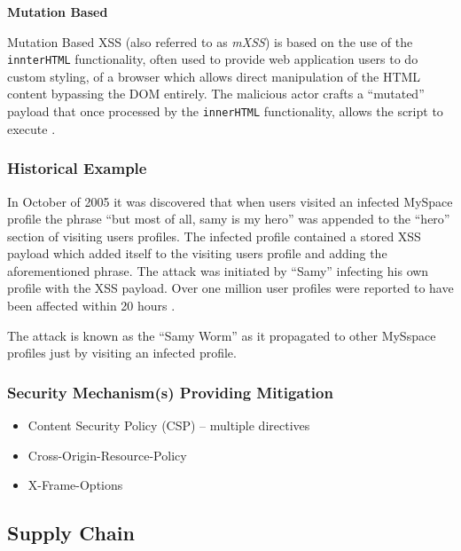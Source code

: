 \documentclass{mscreport}
\begin{document}
\vspace{0.6cm} \noindent
\textbf{Mutation Based}

\vspace{0.2cm} \noindent
Mutation Based XSS (also referred to as \textit{mXSS}) is based on the use of the \texttt{innterHTML} functionality, often used to provide web application users to do custom styling, of a browser which allows direct manipulation of the HTML content bypassing the DOM entirely. The malicious actor crafts a ``mutated'' payload that once processed by the \texttt{innerHTML} functionality, allows the script to execute \cite{Heiderich2013-qv}.

\subsubsection{Historical Example}
In October of 2005 it was discovered that when users visited an infected MySpace profile the phrase ``but most of all, samy is my hero'' was appended to the ``hero'' section of visiting users profiles. The infected profile contained a stored XSS payload which added itself to the visiting users profile and adding the aforementioned phrase. The attack was initiated by ``Samy'' infecting his own profile with the XSS payload. Over one million user profiles were reported to have been affected within 20 hours \cite{Lee2019-xf}.

\vspace{0.2cm} \noindent
The attack is known as the ``Samy Worm'' as it propagated to other MySspace profiles just by visiting an infected profile.

\subsubsection{Security Mechanism(s) Providing Mitigation}

\begin{itemize}
	\setlength\itemsep{0.1em}
	\item Content Security Policy (CSP) – multiple directives
	\item Cross-Origin-Resource-Policy
	\item X-Frame-Options
\end{itemize}


\subsection{Supply Chain}
\label{subsection:SupplyChain}
\end{document}
